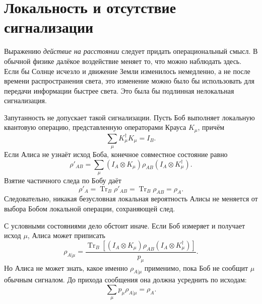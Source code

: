 \section{Локальность и отсутствие сигнализации}

Выражению \emph{действие на расстоянии} следует придать операциональный смысл. В обычной физике далёкое воздействие меняет то, что можно наблюдать здесь. Если бы Солнце исчезло и движение Земли изменилось немедленно, а не после времени распространения света, это изменение можно было бы использовать для передачи информации быстрее света. Это была бы подлинная нелокальная сигнализация.

Запутанность не допускает такой сигнализации. Пусть Боб выполняет локальную квантовую операцию, представленную операторами Крауса \(K_\mu\), причём
\begin{equation}
\sum_\mu K_\mu^\dagger K_\mu=I_B.
\end{equation}
Если Алиса не узнаёт исход Боба, конечное совместное состояние равно
\begin{equation}
\rho'_{AB}
=\sum_\mu
(I_A\otimes K_\mu)\rho_{AB}
(I_A\otimes K_\mu^\dagger).
\end{equation}
Взятие частичного следа по Бобу даёт
\begin{equation}
\rho'_A
=\operatorname{Tr}_B\rho'_{AB}
=\operatorname{Tr}_B\rho_{AB}
=\rho_A.
\label{eq:l7-no-signaling}
\end{equation}
Следовательно, никакая безусловная локальная вероятность Алисы не меняется от выбора Бобом локальной операции, сохраняющей след.

С условными состояниями дело обстоит иначе. Если Боб измеряет и получает исход \(\mu\), Алиса может приписать
\begin{equation}
\rho_{A|\mu}
=\frac{
\operatorname{Tr}_B\!\left[
(I_A\otimes K_\mu)\rho_{AB}
(I_A\otimes K_\mu^\dagger)
\right]
}{p_\mu}.
\label{eq:l7-conditioned-state}
\end{equation}
Но Алиса не может знать, какое именно \(\rho_{A|\mu}\) применимо, пока Боб не сообщит \(\mu\) обычным сигналом. До прихода сообщения она должна усреднить по исходам:
\begin{equation}
\sum_\mu p_\mu\rho_{A|\mu}=\rho_A.
\label{eq:l7-conditioned-average}
\end{equation}

\begin{classroomqa}
\end{classroomqa}

